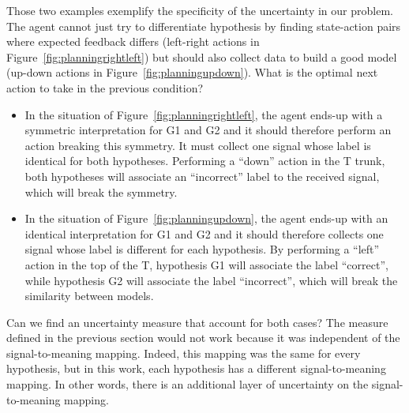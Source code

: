 Those two examples exemplify the specificity of the uncertainty in our problem. The agent cannot just try to differentiate hypothesis by finding state-action pairs where expected feedback differs (left-right actions in Figure~\ref{fig:planningrightleft}) but should also collect data to build a good model (up-down actions in Figure~\ref{fig:planningupdown}). What is the optimal next action to take in the previous condition?

\begin{itemize}
\item In the situation of Figure~\ref{fig:planningrightleft}, the agent ends-up with a symmetric interpretation for G1 and G2 and it should therefore perform an action breaking this symmetry. It must collect one signal whose label is  identical for both hypotheses. Performing a ``down'' action in the T trunk, both hypotheses will associate an ``incorrect'' label to the received signal, which will break the symmetry.
\item In the situation of Figure~\ref{fig:planningupdown}, the agent ends-up with an identical interpretation for G1 and G2 and it should therefore collects one signal whose label is different for each hypothesis. By performing a ``left'' action in the top of the T, hypothesis G1 will associate the label ``correct'', while hypothesis G2 will associate the label ``incorrect'', which will break the similarity between models.
\end{itemize}

Can we find an uncertainty measure that account for both cases? The measure defined in the previous section would not work because it was independent of the signal-to-meaning mapping. Indeed, this mapping was the same for every hypothesis, but in this work, each hypothesis has a different signal-to-meaning mapping. In other words, there is an additional layer of uncertainty on the signal-to-meaning mapping.


